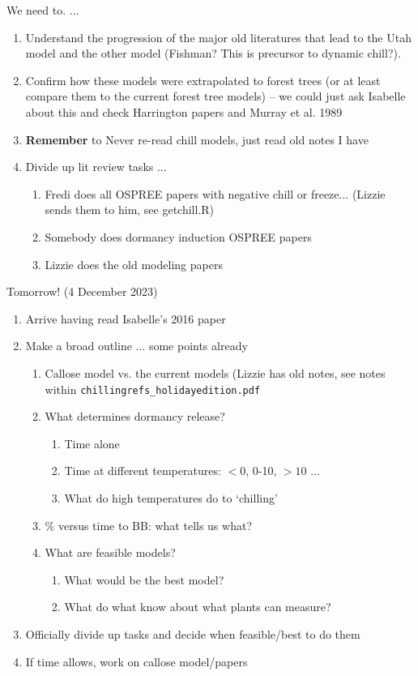 \documentclass[11pt,letter]{article}
\begin{document}
We need to. ...	
\begin{enumerate}
\item Understand the progression of the major old literatures that lead to the Utah model and the other model (Fishman? This is precursor to dynamic chill?). 
\item Confirm how these models were extrapolated to forest trees (or at least compare them to the current forest tree models) -- we could just ask Isabelle about this and check Harrington papers and Murray et al. 1989
\item {\bf Remember} to Never re-read chill models, just read old notes I have
\item Divide up lit review tasks ...
\begin{enumerate}
\item Fredi does all OSPREE papers with negative chill or freeze... (Lizzie sends them to him, see getchill.R)
\item Somebody does dormancy induction OSPREE papers
\item Lizzie does the old modeling papers
\end{enumerate}
\end{enumerate}

Tomorrow! (4 December 2023)
\begin{enumerate}
\item Arrive having read Isabelle's 2016 paper
\item Make a broad outline ... some points already
\begin{enumerate}
\item Callose model vs. the current models (Lizzie has old notes, see notes within \verb|chillingrefs_holidayedition.pdf|
\item What determines dormancy release?
\begin{enumerate}
\item Time alone
\item Time at different temperatures: $<0$, 0-10, $>10$ ... 
\item What do high temperatures do to `chilling'
\end{enumerate}
\item  \% versus time to BB: what tells us what? 
\item What are feasible models?
\begin{enumerate}
\item What would be the best model?
\item What do what know about what plants can measure?
\end{enumerate}
\end{enumerate}
\item Officially divide up tasks and decide when feasible/best to do them
\item If time allows, work on callose model/papers
\end{enumerate}
\end{document}
